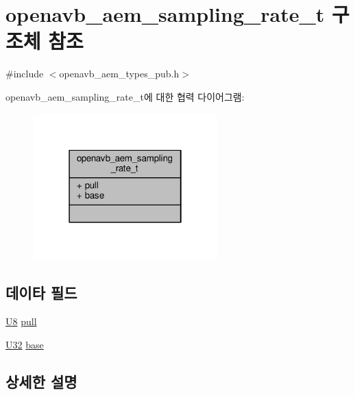 \hypertarget{structopenavb__aem__sampling__rate__t}{}\section{openavb\+\_\+aem\+\_\+sampling\+\_\+rate\+\_\+t 구조체 참조}
\label{structopenavb__aem__sampling__rate__t}


{\ttfamily \#include $<$openavb\+\_\+aem\+\_\+types\+\_\+pub.\+h$>$}



openavb\+\_\+aem\+\_\+sampling\+\_\+rate\+\_\+t에 대한 협력 다이어그램\+:
\nopagebreak
\begin{figure}[H]
\begin{center}
\leavevmode
\includegraphics[width=202pt]{structopenavb__aem__sampling__rate__t__coll__graph}
\end{center}
\end{figure}
\subsection*{데이타 필드}
\begin{DoxyCompactItemize}
\item 
\hyperlink{openavb__types__base__pub_8h_aa63ef7b996d5487ce35a5a66601f3e73}{U8} \hyperlink{structopenavb__aem__sampling__rate__t_af1ed3465afc211f5d24f8e8a54e1de51}{pull}
\item 
\hyperlink{openavb__types__base__pub_8h_a696390429f2f3b644bde8d0322a24124}{U32} \hyperlink{structopenavb__aem__sampling__rate__t_ad25f20e8ea6ae8be0b21550178138a6e}{base}
\end{DoxyCompactItemize}


\subsection{상세한 설명}



